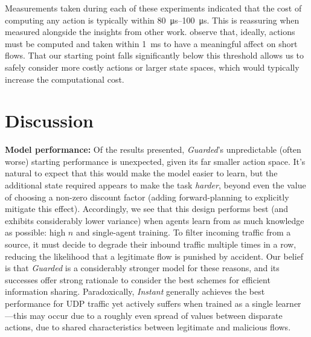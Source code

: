 \documentclass[10pt, times, comsoc]{IEEEtran}
\newcommand{\fakepara}[1]{\noindent\textbf{#1:}}
\begin{document}
Measurements taken during each of these experiments indicated that the cost of computing any action is typically within \SIrange{80}{100}{\micro\second}.
This is reassuring when measured alongside the insights from other work.
\Textcite{DBLP:conf/sigcomm/ChenL0L18} observe that, ideally, actions must be computed and taken within \SI{1}{\milli\second} to have a meaningful affect on short flows.
That our starting point falls significantly below this threshold allows us to safely consider more costly actions or larger state spaces, which would typically increase the computational cost.

\section{Discussion}\label{sec:discussion}



\fakepara{Model performance}
Of the results presented, \emph{Guarded}'s unpredictable (often worse) starting performance is unexpected, given its far smaller action space.
It's natural to expect that this would make the model easier to learn, but the additional state required appears to make the task \emph{harder}, beyond even the value of choosing a non-zero discount factor (adding forward-planning to explicitly mitigate this effect).
Accordingly, we see that this design performs best (and exhibits considerably lower variance) when agents learn from as much knowledge as possible: high $n$ and single-agent training.
To filter incoming traffic from a source, it must decide to degrade their inbound traffic multiple times in a row, reducing the likelihood that a legitimate flow is punished by accident.
Our belief is that \emph{Guarded} is a considerably stronger model for these reasons, and its successes offer strong rationale to consider the best schemes for efficient information sharing.
Paradoxically, \emph{Instant} generally achieves the best performance for UDP traffic yet actively suffers when trained as a single learner---this may occur due to a roughly even spread of values between disparate actions, due to shared characteristics between legitimate and malicious flows.
\end{document}
